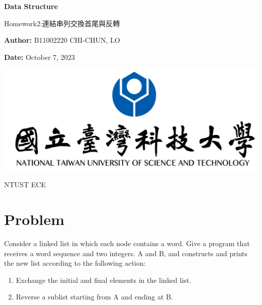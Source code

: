 \documentclass{article}
\begin{document}
	\begin{titlepage}
		\centering
		\vspace*{1cm}
		\Huge
		\textbf{Data Structure}
		
		\vspace{0.5cm}
		\LARGE
		Homework2:連結串列交換首尾與反轉
		
		\vspace{2cm}
		\textbf{Author:} B11002220 CHI-CHUN, LO
		
		\vspace{1cm}



		\textbf{Date: }October 7, 2023
		
		\vfill
		
    	\includegraphics[width=1\textwidth]{logo.png}
		
		\vspace{2cm}
		NTUST ECE
		
	\end{titlepage}
	\pagebreak
	\tableofcontents
	
	
	\pagebreak
	\section{Problem}	
			Consider a linked list in which each node contains a word. Give a program that
		receives a word sequence and two integers. A and B, and constructs and prints the
		new list according to the following action:
		\begin{enumerate}
			\item Exchange the initial and final elements in the linked list.
			\item Reverse a sublist starting from A and ending at B.
		\end{enumerate}
\end{document}
